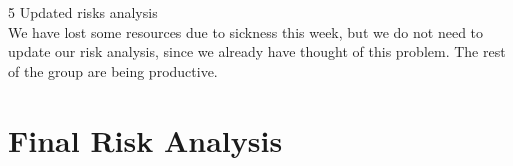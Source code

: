 {\large{5 Updated risks analysis}}\\
We have lost some resources due to sickness this week, but we do not need to update our risk analysis, since we already have thought of this problem. The rest of the group are being productive.

\section{Final Risk Analysis}
\label{final_risk_analysis}

\cleardoublepage